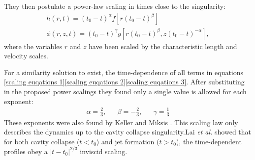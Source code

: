 They then postulate a power-law scaling in times close to the singularity:
\begin{gather}\label{postulated 1}
    h(r,t)=(t_0-t)^{\alpha}f[r(t_0-t)^{\beta}]\\ \label{postulated 2}
    \phi(r,z,t)=(t_0-t)^{\gamma}g[r(t_0-t)^{\beta},z(t_0-t)^{-\alpha}],
\end{gather}
where the variables $r$ and $z$ have been scaled by the characteristic length and velocity scales.

For a similarity solution to exist, the time-dependence of all terms in equations \ref{scaling euqations 1}\ref{scaling euqations 2}\ref{scaling euqations 3}. After substituting in the proposed power scalings they found only a single value is allowed for each exponent:
\begin{align}
    \alpha=\frac{2}{3}, &&\beta = -\frac{2}{3}, && \gamma=\frac{1}{3}
\end{align}
These exponents were also found by Keller and Miksis \cite{keller1983surface}. This scaling law only describes the dynamics up to the cavity collapse singularity.Lai \textit{et al.} showed that for both cavity collapse ($t<t_0$) and jet formation ($t>t_0$), the time-dependent profiles obey a $|t-t_0|^{2/3}$ inviscid scaling\cite{lai2018bubble}.